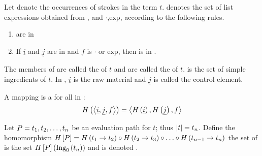 \begin{defi}
Let  denote the occurrences of strokes in the term $t$.  denotes the set of list expressions obtained from , and $\cdot$,$\mbox{exp}$, according to the following rules.
\begin{enumerate}
 \item {} are in 
 \item If $\underline{i}$ and $\underline{j}$ are in  and $f$ is $\cdot$ or $\mbox{exp}$, then  is in .
\end{enumerate}
The members of  are called the  of $t$ and are called the  of $t$.  is the set of simple ingredients of $t$. In , $\underline{i}$ is the raw material and $\underline{j}$ is called the control element.
\cite{conf/ijcai/Geiser75}
\end{defi}

\begin{defi}[Homorphism]
A mapping  is a  \iffTx{} for all  in :
\begin{equation}
H\left(\left\langle \underline{i},\underline{j},f\right\rangle\right) = \left\langle H\left(\underline{i}\right),H\left(\underline{j}\right),f\right\rangle
\end{equation}
\cite{conf/ijcai/Geiser75}
\end{defi}

\begin{defi}
Let $P=t_1,t_2,\ldots,t_n$ be an evaluation path for $t$; thus $\left|t\right|=t_n$. Define the homomorphism $H\left[ P\right]=H\left(t_1\rightarrow t_2\right)\circ H\left(t_2\rightarrow t_3\right)\circ\ldots\circ H\left(t_{n-1}\rightarrow t_n\right)$ the set of  is the set $H\left[ P\right]\left(\mbox{Ing}_0\left(t_n\right)\right)$ and is denoted .
\cite{conf/ijcai/Geiser75}
\end{defi}


